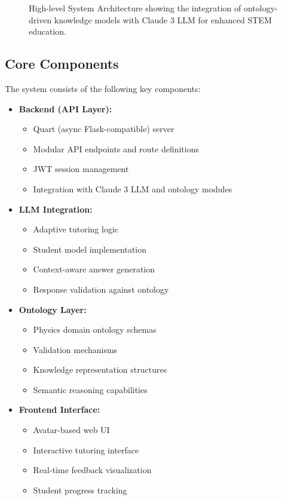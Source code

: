 \begin{figure}[htbp]
    \centering
    
    \caption{High-level System Architecture showing the integration of ontology-driven knowledge models with Claude 3 LLM for enhanced STEM education.}
    \label{fig:system-architecture}
\end{figure}

\subsection{Core Components}
\label{subsec:core-components}

The system consists of the following key components:

\begin{itemize}
    \item \textbf{Backend (API Layer):} 
        \begin{itemize}
            \item Quart (async Flask-compatible) server
            \item Modular API endpoints and route definitions
            \item JWT session management
            \item Integration with Claude 3 LLM and ontology modules
        \end{itemize}
    
    \item \textbf{LLM Integration:} 
        \begin{itemize}
            \item Adaptive tutoring logic
            \item Student model implementation
            \item Context-aware answer generation
            \item Response validation against ontology
        \end{itemize}
    
    \item \textbf{Ontology Layer:} 
        \begin{itemize}
            \item Physics domain ontology schemas
            \item Validation mechanisms
            \item Knowledge representation structures
            \item Semantic reasoning capabilities
        \end{itemize}
    
    \item \textbf{Frontend Interface:} 
        \begin{itemize}
            \item Avatar-based web UI
            \item Interactive tutoring interface
            \item Real-time feedback visualization
            \item Student progress tracking
        \end{itemize}
\end{itemize}

